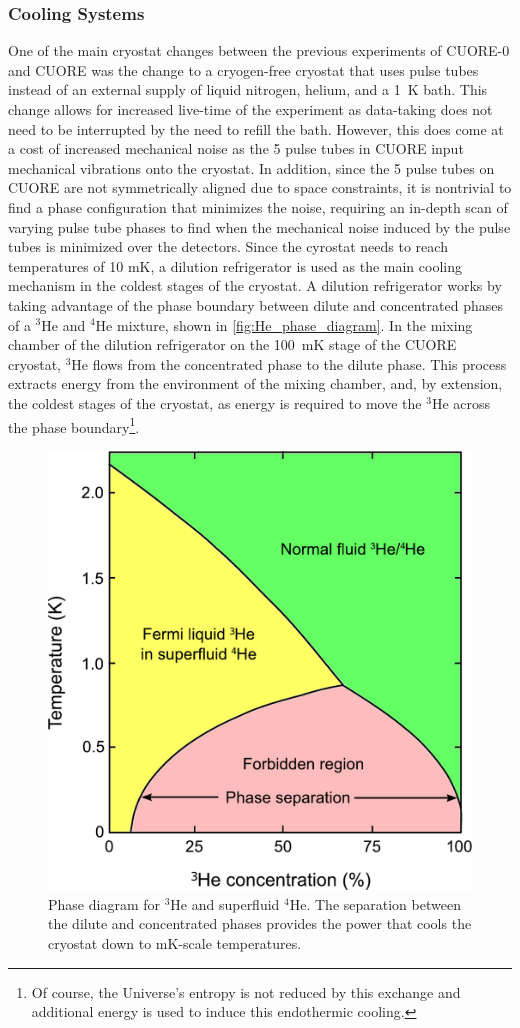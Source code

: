 \subsubsection*{Cooling Systems}
\label{sssec:Cooling Systems}
One of the main cryostat changes between the previous experiments of CUORE-0 and CUORE was the change to a cryogen-free cryostat that uses pulse tubes instead of an external supply of liquid nitrogen, helium, and a 1~K bath.
This change allows for increased live-time of the experiment as data-taking does not need to be interrupted by the need to refill the bath.
However, this does come at a cost of increased mechanical noise as the 5 pulse tubes in CUORE input mechanical vibrations onto the cryostat.
In addition, since the 5 pulse tubes on CUORE are not symmetrically aligned due to space constraints, it is nontrivial to find a phase configuration that minimizes the noise, requiring an in-depth scan of varying pulse tube phases to find when the mechanical noise induced by the pulse tubes is minimized over the detectors.
Since the cyrostat needs to reach temperatures of 10 mK, a dilution refrigerator is used as the main cooling mechanism in the coldest stages of the cryostat.
A dilution refrigerator works by taking advantage of the phase boundary between dilute and concentrated phases of a $^3$He and $^4$He mixture, shown in \autoref{fig:He_phase_diagram}.
In the mixing chamber of the dilution refrigerator on the 100~mK stage of the CUORE cryostat, $^3$He flows from the concentrated phase to the dilute phase.
This process extracts energy from the environment of the mixing chamber, and, by extension, the coldest stages of the cryostat, as energy is required to move the $^3$He across the phase boundary\footnote{Of course, the Universe's entropy is not reduced by this exchange and additional energy is used to induce this endothermic cooling.}.

\begin{figure}
    \centering
    \includegraphics[width=0.6\linewidth]{Figures/Helium_phase_diagram.pdf}
    \caption[Phase diagram for $^{3}$He and superfluid $^{4}$He.]
    {Phase diagram for $^{3}$He and superfluid $^{4}$He.
    The separation between the dilute and concentrated phases provides the power that cools the cryostat down to mK-scale temperatures.}
    \label{fig:He_phase_diagram}
\end{figure}


